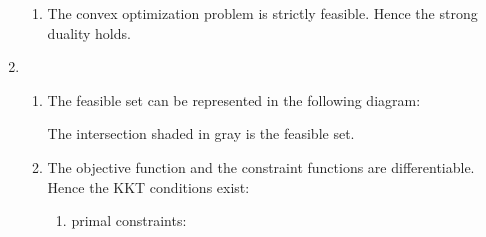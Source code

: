 \documentclass[11pt, letterpaper, titlepage]{article}
\begin{document}
\begin{enumerate}
\begin{enumerate}
        \item %
        
        The convex optimization problem is strictly feasible. Hence the strong duality holds.
        
    \end{enumerate}
    
    \item %
    
    \begin{enumerate}
        
        \item %
        
        The feasible set can be represented in the following diagram:
        
        \begin{center}
        \def\circlea{(1, 1) circle (1)}
        \def\circleb{(1, -1) circle (2)}
        \end{center}
        
        The intersection shaded in gray is the feasible set.
        
        \item %
        
        The objective function and the constraint functions are differentiable. Hence the KKT conditions exist:
        
        \begin{enumerate}
            
            \item primal constraints: 
            

\end{enumerate}
\end{enumerate}
\end{enumerate}
\end{document}
